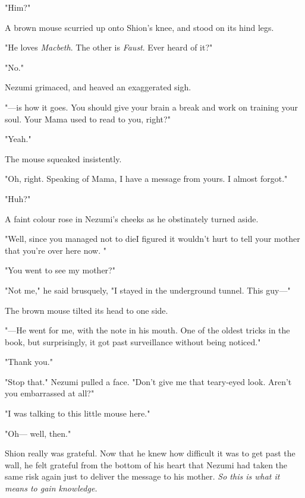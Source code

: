 "Him?"

A brown mouse scurried up onto Shion's knee, and stood on its hind legs.

"He loves \emph{Macbeth}. The other is \emph{Faust}. Ever heard of it?"

"No."

Nezumi grimaced, and heaved an exaggerated sigh.


"---is how it goes. You should give your brain a break and work on
training your soul. Your Mama used to read to you, right?"

"Yeah."

The mouse squeaked insistently.

"Oh, right. Speaking of Mama, I have a message from yours. I almost
forgot."

"Huh?"

A faint colour rose in Nezumi's cheeks as he obstinately turned aside.

"Well, since you managed not to die\el I figured it wouldn't hurt to
tell your mother that you're over here now. "

"You went to see my mother?"

"Not me," he said brusquely, "I stayed in the underground tunnel. This
guy---"

The brown mouse tilted its head to one side.

"---He went for me, with the note in his mouth. One of the oldest tricks
in the book, but surprisingly, it got past surveillance without being
noticed."

"Thank you."

"Stop that." Nezumi pulled a face. "Don't give me that teary-eyed look.
Aren't you embarrassed at all?"

"I was talking to this little mouse here."

"Oh--- well, then."

Shion really was grateful. Now that he knew how difficult it was to get
past the wall, he felt grateful from the bottom of his heart that Nezumi
had taken the same risk again just to deliver the message to his mother.
\emph{So this is what it means to gain knowledge.}

